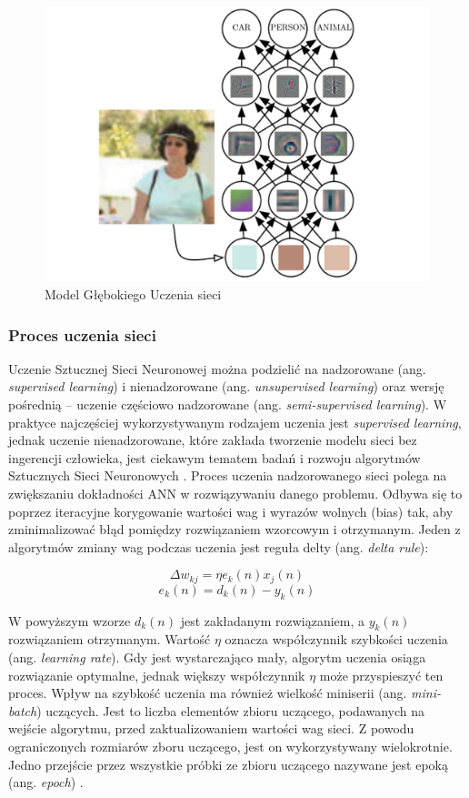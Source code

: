 \begin{figure}[!h]
  \centering
  \includegraphics[width=\textwidth]{img/dnn-object-recog.png}
  \caption{Model Głębokiego Uczenia sieci \cite{Goodfellow-et-al-2016}}
  \label{dnn}
\end{figure}


\subsubsection{Proces uczenia sieci}

Uczenie Sztucznej Sieci Neuronowej można podzielić na nadzorowane (ang. \emph{supervised learning}) i nienadzorowane (ang. \emph{unsupervised learning}) oraz wersję pośrednią -- uczenie częściowo nadzorowane (ang. \emph{semi-supervised learning}). W praktyce najczęściej wykorzystywanym rodzajem uczenia jest \emph{supervised learning}, jednak uczenie nienadzorowane, które zakłada tworzenie modelu sieci bez ingerencji człowieka, jest ciekawym tematem badań i rozwoju algorytmów Sztucznych Sieci Neuronowych \cite{nielsen2015neural}.
Proces uczenia nadzorowanego sieci polega na zwiększaniu dokładności ANN w rozwiązywaniu danego problemu. Odbywa się to poprzez iteracyjne korygowanie wartości wag i wyrazów wolnych (bias) tak, aby zminimalizować błąd pomiędzy rozwiązaniem wzorcowym i otrzymanym. Jeden z algorytmów zmiany wag podczas uczenia jest reguła delty (ang. \emph{delta rule}):


$$\Delta w_{kj} = \eta e_k(n)x_j(n) $$
$$ e_k(n) = d_k(n) - y_k(n) $$

W powyższym wzorze $d_k(n)$ jest zakładanym rozwiązaniem, a $y_k(n)$ rozwiązaniem otrzymanym.
Wartość $\eta$ oznacza współczynnik szybkości uczenia (ang. \emph{learning rate}). Gdy jest wystarczająco mały, algorytm uczenia osiąga rozwiązanie optymalne, jednak większy współczynnik $\eta$ może przyspieszyć ten proces. Wpływ na szybkość uczenia ma również wielkość miniserii (ang. \emph{mini-batch}) uczących. Jest to liczba elementów zbioru uczącego, podawanych na wejście algorytmu, przed zaktualizowaniem wartości wag sieci. Z powodu ograniczonych rozmiarów zboru uczącego, jest on wykorzystywany wielokrotnie. Jedno przejście przez wszystkie próbki ze zbioru uczącego nazywane jest epoką (ang. \emph{epoch}) \cite{tadeusiewicz2015leksykon}.

